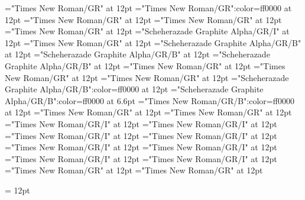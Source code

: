 \documentclass[a4paper]{article}
\begin{document}
\pagestyle{plain}
\sloppy
\setlength{\parfillskip}{0pt plus 1fil}
\font\spanen="Times New Roman/GR" at 12pt
\font\spanur="Times New Roman/GR":color=ff0000 at 12pt
\font\diven="Times New Roman/GR" at 12pt
\font\divur="Times New Roman/GR" at 12pt
\font\xitemxitemdefinitionbefore="Times New Roman/GR" at 12pt
\font\xitemxitemexamplebefore="Scheherazade Graphite Alpha/GR/I" at 12pt
\font\xitemxitemexamplesbefore="Times New Roman/GR" at 12pt
\font\xitemxitemheadwordbefore="Scheherazade Graphite Alpha/GR/B" at 12pt
\font\xitemxitemheadwordminorbefore="Scheherazade Graphite Alpha/GR/B" at 12pt
\font\xitemxitemLexEntrypublishRootMinorPrimaryTargetHeadWordRefbefore="Scheherazade Graphite Alpha/GR/B" at 12pt
\font\xitemxitemlexreftargetsbefore="Times New Roman/GR" at 12pt
\font{}="Times New Roman/GR" at 12pt
\font\entryletDatadicBody="Times New Roman/GR" at 12pt
\font\headwordurentryletDatadicBody="Scheherazade Graphite Alpha/GR/B":color=ff0000 at 12pt
\font\xhomographnumberheadwordurentryletDatadicBody="Scheherazade Graphite Alpha/GR/B":color=ff0000 at 6.6pt
\font\spanenheadwordurentryletDatadicBody="Times New Roman/GR/B":color=ff0000 at 12pt
\font\sensesentryletDatadicBody="Times New Roman/GR" at 12pt
\font\sensesensesentryletDatadicBody="Times New Roman/GR" at 12pt
\font\grammaticalinfosensesensesentryletDatadicBody="Times New Roman/GR/I" at 12pt
\font\partofspeechengrammaticalinfosensesensesentryletDatadicBody="Times New Roman/GR/I" at 12pt
\font\spanenpartofspeechengrammaticalinfosensesensesentryletDatadicBody="Times New Roman/GR/I" at 12pt
\font\slotsgrammaticalinfosensesensesentryletDatadicBody="Times New Roman/GR/I" at 12pt
\font\spanenslotsgrammaticalinfosensesensesentryletDatadicBody="Times New Roman/GR/I" at 12pt
\font\slotnameenslotsgrammaticalinfosensesensesentryletDatadicBody="Times New Roman/GR/I" at 12pt
\font\spanenslotnameenslotsgrammaticalinfosensesensesentryletDatadicBody="Times New Roman/GR/I" at 12pt
\font\spanengrammaticalinfosensesensesentryletDatadicBody="Times New Roman/GR/I" at 12pt
\font{}="Times New Roman/GR" at 12pt
\font\spanendefinitionensensesensesentryletDatadicBody="Times New Roman/GR" at 12pt

\mbox{} 
\newpage 
\newpage 
\setcounter{page}{1} 
\pagestyle{fancy} 
\setlength{\columnsep}{1.5em} 
\setlength\columnseprule{0.4pt} 
\begin{multicols}{2}{\raggedleft} \begin{spacing}{1.5}
\hangindent= 12pt
  \spanenslotsgrammaticalinfosensesensesentryletDatadicBody{: }  \end{spacing}
 \end{multicols}
\end{document}
